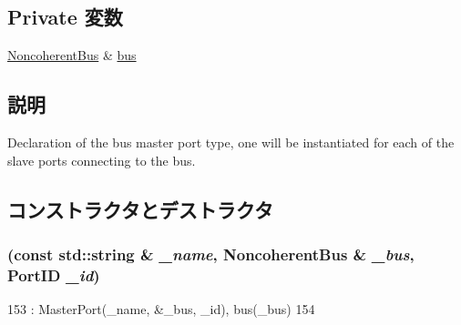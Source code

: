 \subsection*{Private 変数}
\begin{DoxyCompactItemize}
\item 
\hyperlink{classNoncoherentBus}{NoncoherentBus} \& \hyperlink{classNoncoherentBus_1_1NoncoherentBusMasterPort_aea8faab4afa44810e2dfac0ab026fb82}{bus}
\end{DoxyCompactItemize}


\subsection{説明}
Declaration of the bus master port type, one will be instantiated for each of the slave ports connecting to the bus. 

\subsection{コンストラクタとデストラクタ}
\hypertarget{classNoncoherentBus_1_1NoncoherentBusMasterPort_a8340f584bc1b01456a1c7f25d4049eef}{
\subsubsection[{NoncoherentBusMasterPort}]{ (const std::string \& {\em \_\-name}, \/  {\bf NoncoherentBus} \& {\em \_\-bus}, \/  {\bf PortID} {\em \_\-id})}}
\label{classNoncoherentBus_1_1NoncoherentBusMasterPort_a8340f584bc1b01456a1c7f25d4049eef}



\begin{DoxyCode}
153             : MasterPort(_name, &_bus, _id), bus(_bus)
154         { }
\end{DoxyCode}


